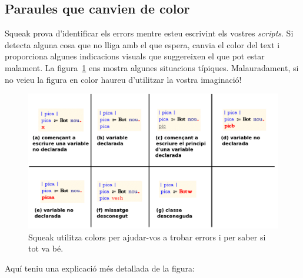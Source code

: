 \subsection{Paraules que canvien de color}
Squeak prova d'identificar els errors mentre esteu escrivint els vostres \emph{scripts}. Si detecta alguna cosa que no lliga amb el que espera, canvia el color del text i proporciona algunes indicacions visuals que suggereixen el que pot estar malament. La figura~\ref{fig0210} ens mostra algunes situacions típiques. Malauradament, si no veieu la figura en color haureu d'utilitzar la vostra imaginació!

\begin{figure}[h]
\begin{center}
\includegraphics[scale=0.75]{Imatges/figura2-10}
\end{center}
\caption{Squeak utilitza colors per ajudar-vos a trobar errors i per saber si tot va bé.}
\label{fig0210}
\end{figure}

Aquí teniu una explicació més detallada de la figura: 

